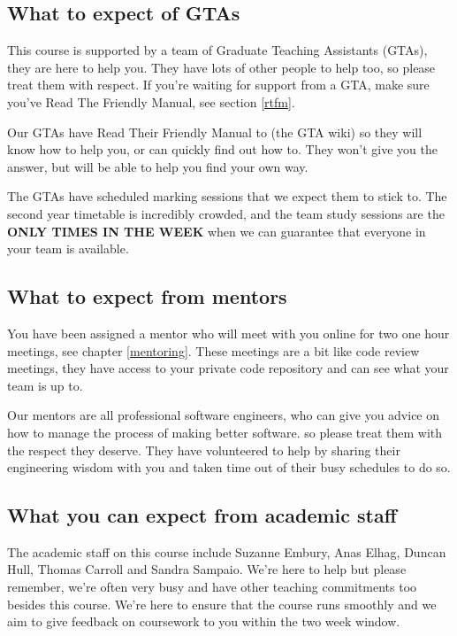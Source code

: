 \documentclass[
]{book}
\begin{document}
\hypertarget{gtas}{%
\subsection{What to expect of GTAs}\label{gtas}}

This course is supported by a team of Graduate Teaching Assistants (GTAs), they are here to help you. They have lots of other people to help too, so please treat them with respect. If you're waiting for support from a GTA, make sure you've Read The Friendly Manual, see section \ref{rtfm}.

Our GTAs have Read Their Friendly Manual to (the GTA wiki) so they will know how to help you, or can quickly find out how to. They won't give you the answer, but will be able to help you find your own way.

The GTAs have scheduled marking sessions that we expect them to stick to. The second year timetable is incredibly crowded, and the team study sessions are the \textbf{ONLY TIMES IN THE WEEK} when we can guarantee that everyone in your team is available.

\hypertarget{gomentors}{%
\subsection{What to expect from mentors}\label{gomentors}}

You have been assigned a mentor who will meet with you online for two one hour meetings, see chapter \ref{mentoring}. These meetings are a bit like code review meetings, they have access to your private code repository and can see what your team is up to.

Our mentors are all professional software engineers, who can give you advice on how to manage the process of making better software. so please treat them with the respect they deserve. They have volunteered to help by sharing their engineering wisdom with you and taken time out of their busy schedules to do so.

\hypertarget{academics}{%
\subsection{What you can expect from academic staff}\label{academics}}

The academic staff on this course include Suzanne Embury, Anas Elhag, Duncan Hull, Thomas Carroll and Sandra Sampaio. We're here to help but please remember, we're often very busy and have other teaching commitments too besides this course. We're here to ensure that the course runs smoothly and we aim to give feedback on coursework to you within the two week window.
\end{document}
